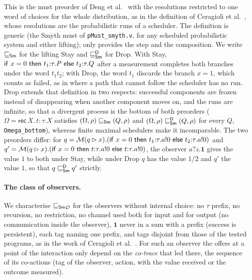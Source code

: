 This is the must preorder of Deng et al.~\cite{DvGHM08} with the
resolutions restricted to one word of choices for the whole distribution,
as in the definition of Ceragioli et al.~\cite[Definition 7]{Ceragioli27}, whose resolutions are the
probabilistic runs of a scheduler. The definition is generic (the Smyth
must of \texttt{pMust\_smyth.v}, for any scheduled probabilistic system
and either lifting); \lqCCS only provides the step and the composition. We
write $\sqsubseteq_{\mathsf{Sm}}$ for the lifting Stay and $\sqsubseteq_{\mathsf{Sm}}^{\mathsf{D}}$ for Drop.
With Stay, $\mathsf{if}\ x = 0\ \mathsf{then}\ t_1{:}\tau.P\ \mathsf{else}\ t_2{:}\tau.Q$ after a measurement
completes both branches under the word $t_1 t_2$; with Drop, the word $t_1$
discards the branch $x = 1$, which counts as failed, as in
\cite{Ceragioli27} where a path that cannot follow the scheduler has no
run. Drop extends that definition in two respects: successful components
are frozen instead of disappearing when another component moves on, and
the runs are infinite, so that a divergent process is the bottom of both
preorders ($\Omega = \mathsf{rec}\,X.\,t{:}\tau.X$ satisfies $(\Omega,
\rho) \sqsubseteq_{\mathsf{Sm}} (Q, \rho)$ and $(\Omega, \rho) \sqsubseteq_{\mathsf{Sm}}^{\mathsf{D}} (Q, \rho)$
for every $Q$, \texttt{Omega\_bottom}), whereas finite maximal schedulers make
it incomparable. The two preorders differ: for
$q = \mathcal{M}(q \rhd x).(\mathsf{if}\ x=0\ \mathsf{then}\ t_1{:}\tau.a!0\ \mathsf{else}\ t_2{:}\tau.a!0)$ and
$q' = \mathcal{M}(q \rhd x).(\mathsf{if}\ x=0\ \mathsf{then}\ t{:}\tau.a!0\ \mathsf{else}\ t{:}\tau.a!0)$, the observer
$a?z.\mathbf{1}$ gives the value $1$ to both under Stay, while under Drop
$q$ has the value $1/2$ and $q'$ the value $1$, so that
$q \sqsubseteq_{\mathsf{Sm}}^{\mathsf{D}} q'$ strictly.

\paragraph{The class of observers.} We characterise ${\sqsubseteq_{\mathsf{Sm}}}_{\mathcal{O}}$
for the observers without internal choice: no $\tau$ prefix, no recursion,
no restriction, no channel used both for input and for output (no
communication inside the observer), $\mathbf{1}$ never in a sum with a
prefix (success is persistent), each tag naming one prefix, and tags
disjoint from those of the tested programs, as in the work of Ceragioli et al.~\cite{Ceragioli27}.
For such an observer the offers at a point of the interaction only depend on
the \emph{co-trace} that led there, the sequence of its co-actions (tag of
the observer, action, with the value received or the outcome measured).

